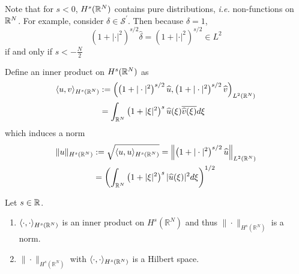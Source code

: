 \begin{rmk}
	Note that for $s < 0$, $H^s(\mathbb{R}^N)$ contains pure distributions, \emph{i.e.} non-functions on $\mathbb{R}^N$. For example, consider $\delta \in \mathcal{S}^\prime$. Then because $\widehat{\delta} = 1$,
	\begin{equation*}
		\left(1+|\cdot|^2\right)^{s / 2} \widehat{\delta}= \left(1+|\cdot|^2\right)^{s / 2} \in L^2
	\end{equation*}
	if and only if $s < -\frac{N}{2}$
\end{rmk}

\noindent Define an inner product on $H^s(\mathbb{R}^N)$ as
\begin{equation*}
	\begin{aligned}
		\langle u, v \rangle_{H^s\left(\mathbb{R}^N\right)} & :=\left(\left(1+|\cdot|^2\right)^{s / 2} \widehat{u},\left(1+|\cdot|^2\right)^{s / 2} \widehat{v}\right)_{L^2\left(\mathbb{R}^N\right)} \\
		& =\int_{\mathbb{R}^N}\left(1+|\xi|^2\right)^s \widehat{u}(\xi) \overline{\widehat{v}(\xi)} d \xi
	\end{aligned}
\end{equation*}
which induces a norm
\begin{equation*}
	\begin{aligned}
		\|u\|_{H^s\left(\mathbb{R}^N\right)} & :=\sqrt{\langle u, u \rangle_{H^s\left(\mathbb{R}^N\right)}}=\left\|\left(1+|\cdot|^2\right)^{s / 2} \widehat{u}\right\|_{L^2\left(\mathbb{R}^N\right)} \\
		& =\left(\int_{\mathbb{R}^N}\left(1+|\xi|^2\right)^s|\widehat{u}(\xi)|^2 d \xi\right)^{1 / 2}
	\end{aligned}
\end{equation*}
\begin{thm}
	Let $s \in \mathbb{R}$.
	\begin{enumerate}[label=(\arabic{*})]
		\item $\langle \cdot, \cdot \rangle_{H^s\left(\mathbb{R}^N\right)}$ is an inner product on $H^s\left(\mathbb{R}^N\right)$ and thus $\|\cdot\|_{H^s\left(\mathbb{R}^N\right)}$ is a norm.

		\item $\|\cdot\|_{H^s\left(\mathbb{R}^N\right)}$ with $\langle \cdot, \cdot \rangle_{H^s\left(\mathbb{R}^N\right)}$ is a Hilbert space.
	\end{enumerate}
\end{thm}
